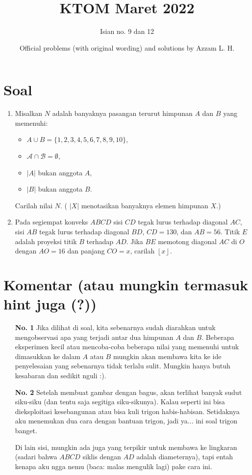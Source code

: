 \documentclass[12pt]{scrartcl}
\title{\vspace{-2cm}\textcolor{Red!80}{K}\textcolor{Green!80}{T}\textcolor{Blue!70}{O}\textcolor{YellowOrange!80}{M} Maret 2022}
\author{\vspace{-1.5cm}Isian no. 9 dan 12}
\date{\vspace{-0.4cm}Official problems (with original wording) and solutions by Azzam L. H.}
\begin{document}
\maketitle
\pagestyle{plain}
\vspace{-1.5cm}
\section{Soal}
\begin{enumerate}
\item Misalkan $N$ adalah banyaknya pasangan terurut himpunan $A$ dan $B$ yang memenuhi:
\begin{itemize}
\item $A \cup B = \{1,2,3,4,5,6,7,8,9,10\}$,
\item $\mathcal{A} \cap \mathcal{B} = \emptyset$,
\item $|A|$ bukan anggota $A$,
\item $|B|$ bukan anggota $B$.
\end{itemize}
Carilah nilai $N$. ( $|X|$ menotasikan banyaknya elemen himpunan $X$.)

\item Pada segiempat konveks $ABCD$ sisi $CD$ tegak lurus terhadap diagonal $AC$, sisi $AB$ tegak lurus terhadap diagonal $BD$, $CD = 130$, dan $AB = 56$. Titik $E$ adalah proyeksi titik $B$ terhadap $AD$. Jika $BE$ memotong diagonal $AC$ di $O$ dengan $AO = 16$ dan panjang $CO = x$, carilah $\left \lfloor x \right \rfloor$.
\end{enumerate}

\newpage
\section{Komentar (atau mungkin termasuk hint juga (?))}
\begin{enumerate}
\item[\textbf{No. 1}] Jika dilihat di soal, kita sebenarnya sudah diarahkan untuk mengobservasi apa yang terjadi antar dua himpunan $A$ dan $B$. Beberapa eksperimen kecil atau mencoba-coba beberapa nilai yang memenuhi untuk dimasukkan ke dalam $A$ atau $B$ mungkin akan membawa kita ke ide penyelesaian yang sebenarnya tidak terlalu sulit. Mungkin hanya butuh kesabaran dan sedikit nguli :).

\item[\textbf{No. 2}] Setelah membuat gambar dengan bagus, akan terlihat banyak sudut siku-siku (dan tentu saja segitiga siku-sikunya). Kalau seperti ini bisa dieksploitasi kesebangunan atau bisa kuli trigon habis-habisan. Setidaknya aku menemukan dua cara dengan bantuan trigon, jadi ya... ini soal trigon banget.

Di lain sisi, mungkin ada juga yang terpikir untuk membawa ke lingkaran (sadari bahwa $ABCD$ siklis dengan $AD$ adalah diameternya), tapi entah kenapa aku ngga nemu (baca: malas mengulik lagi) pake cara ini.
\end{enumerate}
\end{document}
